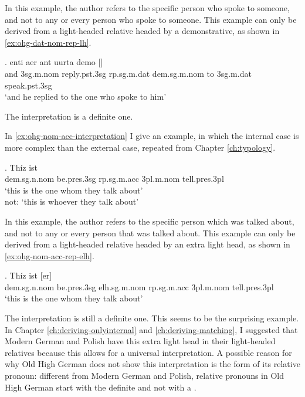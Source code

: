 In this example, the author refers to the specific person who spoke to someone, and not to any or every person who spoke to someone.
This example can only be derived from a light-headed relative headed by a demonstrative, as shown in \ref{ex:ohg-dat-nom-rep-lh}.

\exg. enti aer {ant uurta} demo []  \\
and 3\ac{sg}.\ac{m}.\ac{nom} reply.\ac{pst}.3\ac{sg}\scsub{[dat]} \ac{rp}.\ac{sg}.\ac{m}.\ac{dat} \ac{dem}.\ac{sg}.\ac{m}.\ac{nom} {to 3\ac{sg}.\ac{m}.\ac{dat}} speak.\ac{pst}.3\ac{sg}\scsub{[nom]}\\
`and he replied to the one who spoke to him'
\label{ex:ohg-dat-nom-rep-lh}

The interpretation is a definite one.

In \ref{ex:ohg-nom-acc-interpretation} I give an example, in which the internal case is more complex than the external case, repeated from Chapter \ref{ch:typology}.

\exg. Thíz ist   \\
\ac{dem}.\ac{sg}.\ac{n}.\ac{nom} be.\ac{pres}.3\ac{sg}\scsub{[nom]} \ac{rp}.\ac{sg}.\ac{m}.\ac{acc}
3\ac{pl}.\ac{m}.\ac{nom} tell.\ac{pres}.3\ac{pl}\scsub{[acc]}\\
`this is the one whom they talk about'\\
not: `this is whoever they talk about' \label{ex:ohg-nom-acc-interpretation}

In this example, the author refers to the specific person which was talked about, and not to any or every person that was talked about.
This example can only be derived from a light-headed relative headed by an extra light head, as shown in \ref{ex:ohg-nom-acc-rep-elh}.

\exg. Thíz ist [er]   \\
\ac{dem}.\ac{sg}.\ac{n}.\ac{nom} be.\ac{pres}.3\ac{sg}\scsub{[nom]} \ac{elh}.\ac{sg}.\ac{m}.\ac{nom} \ac{rp}.\ac{sg}.\ac{m}.\ac{acc}
3\ac{pl}.\ac{m}.\ac{nom} tell.\ac{pres}.3\ac{pl}\scsub{[acc]}\\
`this is the one whom they talk about' \label{ex:ohg-nom-acc-rep-elh}

The interpretation is still a definite one. This seems to be the surprising example. In Chapter \ref{ch:deriving-onlyinternal} and \ref{ch:deriving-matching}, I suggested that Modern German and Polish have this extra light head in their light-headed relatives because this allows for a universal interpretation. A possible reason for why Old High German does not show this interpretation is the form of its relative pronoun: different from Modern German and Polish, relative pronouns in Old High German start with the definite  and not with a .

